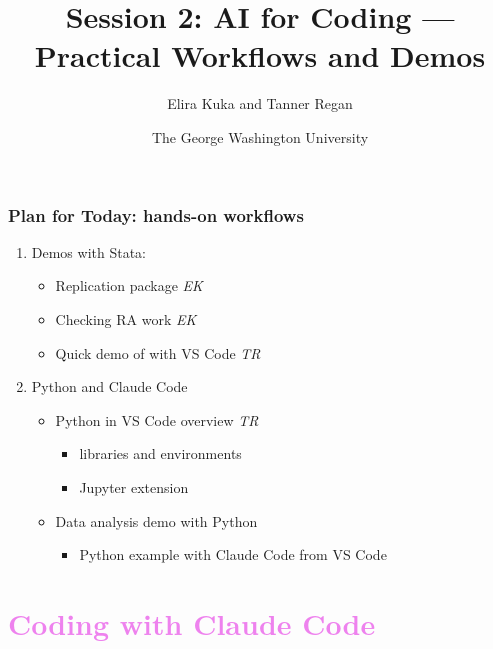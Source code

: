 \documentclass[aspectratio=169, 12pt]{beamer}
\begin{document}
\linespread{1.3}

\title{Session 2: AI for Coding --- \\Practical Workflows and Demos}
\author[AI for Economists]{Elira Kuka and Tanner Regan}
\date[\today]{The George Washington University}
\maketitle


\begin{frame}
\frametitle{Plan for Today: hands-on workflows}

\begin{enumerate}
    \item Demos with Stata:
    \begin{itemize}
        \item[\circ] Replication package {\color{gray}\it EK}
        \item[\circ] Checking RA work {\color{gray}\it EK}
        \item[\circ] Quick demo of with VS Code {\color{gray}\it TR}
    \end{itemize}
    \vspace{0.05in}
    \item Python and Claude Code
    	\begin{itemize}
    		\item[\circ] Python in VS Code overview  {\color{gray}\it TR}
    		\begin{itemize}
        			\item libraries and environments
        			\item Jupyter extension 
    		\end{itemize}
    		\item[\circ] Data analysis demo with Python
    		\begin{itemize}
        			\item Python example with Claude Code from VS Code
    		\end{itemize}
	\end{itemize}
\end{enumerate}

\end{frame}


\section{\textcolor{violet}{Coding with Claude Code \vspace{0.3in}}}
\end{document}
